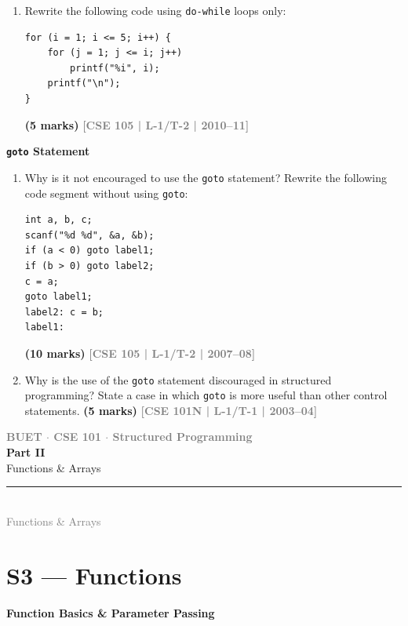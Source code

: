 \documentclass[12pt,a3paper]{article}
\newcommand{\yr}[1]{\hfill\textcolor{gray}{\small\textbf{[#1]}}}
\newcommand{\mk}[1]{\textcolor{orange!70!black}{\small\textbf{(#1 marks)}}}
\newcommand{\subtopic}[2]{%
  \vspace{10pt}
  \noindent\begin{tcolorbox}[colback=#1!8,colframe=#1,boxrule=0.6pt,arc=4pt,
    left=6pt,right=6pt,top=4pt,bottom=4pt]
    \small\bfseries\textcolor{#1}{#2}
  \end{tcolorbox}
  \vspace{2pt}
}
\newcommand{\secdivider}[4]{%
  \newpage\thispagestyle{empty}%
  \vspace*{\fill}%
  \begin{tcolorbox}[enhanced,colback=#4!7,colframe=#3,boxrule=1.5pt,arc=8pt,
    left=20pt,right=20pt,top=22pt,bottom=22pt,
    shadow={3pt}{-3pt}{0pt}{black!15}]
    \centering
    {\large\textcolor{gray}{\textbf{BUET $\cdot$ CSE 101 $\cdot$ Structured Programming}}}\\[8pt]
    {\fontsize{26}{32}\selectfont\bfseries\textcolor{#3}{#1}}\\[6pt]
    {\fontsize{15}{19}\selectfont\textcolor{dgray}{#2}}\\[12pt]
    \textcolor{#3!60}{\rule{0.5\textwidth}{0.5pt}}\\[6pt]
    {\small\textcolor{gray}{#2}}
  \end{tcolorbox}%
  \vspace*{\fill}\newpage%
}
\begin{document}
\begin{enumerate}
\item Rewrite the following code using \texttt{do-while} loops only:
 
\begin{lstlisting}
for (i = 1; i <= 5; i++) {
    for (j = 1; j <= i; j++)
        printf("%i", i);
    printf("\n");
}
\end{lstlisting}
\mk{5} \yr{CSE 105 | L-1/T-2 | 2010--11}

\end{enumerate}

\subtopic{cA}{\texttt{goto} Statement}
\label{sub:s2-goto}

\begin{enumerate}
\item Why is it not encouraged to use the \texttt{goto} statement? Rewrite the following code segment without using \texttt{goto}:
 
\begin{lstlisting}
int a, b, c;
scanf("%d %d", &a, &b);
if (a < 0) goto label1;
if (b > 0) goto label2;
c = a;
goto label1;
label2: c = b;
label1:
\end{lstlisting}
\mk{10} \yr{CSE 105 | L-1/T-2 | 2007--08}


\item Why is the use of the \texttt{goto} statement discouraged in structured programming? State a case in which \texttt{goto} is more useful than other control statements.
\mk{5} \yr{CSE 101N | L-1/T-1 | 2003--04}

\end{enumerate}
\secdivider{Part II}{Functions \& Arrays}{cB}{cB}

\section{S3 --- Functions}
\label{sec:S3}

\subtopic{cB}{Function Basics \& Parameter Passing}
\label{sub:s3-funcbasics}
\end{document}
